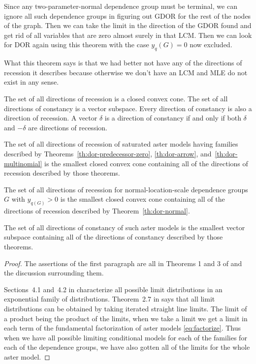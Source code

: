 Since any two-parameter-normal dependence group must be terminal,
we can ignore all such dependence groups in figuring out GDOR for the
rest of the nodes of the graph.  Then we can take the limit in the direction
of the GDOR found and get rid of all variables that are zero almost surely
in that LCM.  Then we can look for DOR again using this theorem
with the case $y_q(G) = 0$ now excluded.

What this theorem says is that we had better not have any of the directions
of recession it describes because otherwise we don't have an LCM and MLE
do not exist in any sense.

\begin{theorem} \label{th:dor-aster}
The set of all directions of recession is a closed convex cone.
The set of all directions of constancy is a vector subspace.
Every direction of constancy is also a direction of recession.
A vector $\delta$ is a direction of constancy if and only if
both $\delta$ and $- \delta$ are directions of recession.

The set of all directions of recession of saturated aster models
having families described by Theorems~\ref{th:dor-predecessor-zero},
\ref{th:dor-arrow}, and~\ref{th:dor-multinomial}
is the smallest closed convex cone containing all of the directions
of recession described by those theorems.

The set of all directions of recession for normal-location-scale
dependence groups $G$ with $y_{q(G)} > 0$
is the smallest closed convex cone containing all of the directions
of recession described by Theorem~\ref{th:dor-normal}.

The set of all directions of constancy of such aster models
is the smallest vector subspace containing all of the directions
of constancy described by those theorems.
\end{theorem}
\begin{proof}
The assertions of the first paragraph are all in Theorems 1 and 3 of
\citet{geyer-gdor} and the discussion surrounding them.

Sections~4.1 and~{4.2} in \citet{geyer-thesis} characterize all possible
limit distributions in an exponential family of distributions.
Theorem~{2.7} in \citet{geyer-thesis} says that all limit distributions
can be obtained by taking iterated straight line limits.
The limit of a product being the product of the limits, when we take a
limit we get a limit in each term of the fundamental factorization of
aster models \eqref{eq:factorize}.
Thus when we have all possible limiting conditional models for each of
the families for each of the dependence groups, we have also gotten
all of the limits for the whole aster model.
\end{proof}

